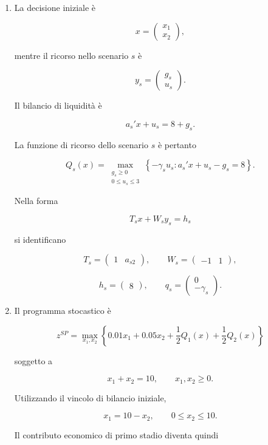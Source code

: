 \begin{enumerate}

\item La decisione iniziale \`e

\[
x=
\begin{pmatrix}
x_1\\
x_2
\end{pmatrix},
\]

mentre il ricorso nello scenario $s$ \`e

\[
y_s=
\begin{pmatrix}
g_s\\
u_s
\end{pmatrix}.
\]

Il bilancio di liquidit\`a \`e

\[
a_s'x+u_s=8+g_s.
\]

La funzione di ricorso dello scenario $s$
\`e pertanto

\[
Q_s(x)
=
\max_{\substack{g_s\geq0\\0\leq u_s\leq3}}
\left\{
-\gamma_su_s:
a_s'x+u_s-g_s=8
\right\}.
\]

Nella forma

\[
T_sx+W_sy_s=h_s
\]

si identificano

\[
T_s=
\begin{pmatrix}
1&a_{s2}
\end{pmatrix},
\qquad
W_s=
\begin{pmatrix}
-1&1
\end{pmatrix},
\]

\[
h_s=
\begin{pmatrix}
8
\end{pmatrix},
\qquad
q_s=
\begin{pmatrix}
0\\
-\gamma_s
\end{pmatrix}.
\]

\item Il programma stocastico \`e

\[
z^{SP}
=
\max_{x_1,x_2}
\left\{
0.01x_1+0.05x_2
+\frac12 Q_1(x)
+\frac12 Q_2(x)
\right\}
\]

soggetto a

\[
x_1+x_2=10,
\qquad
x_1,x_2\geq0.
\]

Utilizzando il vincolo di bilancio iniziale,

\[
x_1=10-x_2,
\qquad
0\leq x_2\leq10.
\]

Il contributo economico di primo stadio
diventa quindi


\end{enumerate}
